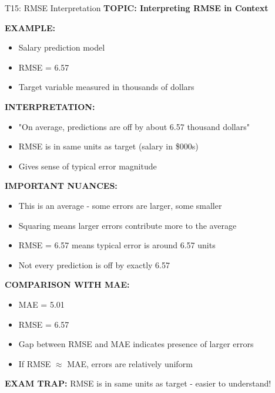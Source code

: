 \documentclass[8pt]{beamer}
\begin{document}
	\begin{frame}{T15: RMSE Interpretation}
		\fontsize{6.5}{7.5}\selectfont
		\textbf{TOPIC: Interpreting RMSE in Context}
		
		\vspace{0.1cm}
		\textbf{EXAMPLE:}
		\begin{itemize}
			\item Salary prediction model
			\item RMSE = 6.57
			\item Target variable measured in thousands of dollars
		\end{itemize}
		
		\vspace{0.1cm}
		\textbf{INTERPRETATION:}
		\begin{itemize}
			\item "On average, predictions are off by about 6.57 thousand dollars"
			\item RMSE is in same units as target (salary in \$000s)
			\item Gives sense of typical error magnitude
		\end{itemize}
		
		\vspace{0.1cm}
		\textbf{IMPORTANT NUANCES:}
		\begin{itemize}
			\item This is an average - some errors are larger, some smaller
			\item Squaring means larger errors contribute more to the average
			\item RMSE = 6.57 means typical error is around 6.57 units
			\item Not every prediction is off by exactly 6.57
		\end{itemize}
		
		\vspace{0.1cm}
		\textbf{COMPARISON WITH MAE:}
		\begin{itemize}
			\item MAE = 5.01
			\item RMSE = 6.57
			\item Gap between RMSE and MAE indicates presence of larger errors
			\item If RMSE $\approx$ MAE, errors are relatively uniform
		\end{itemize}
		
		\textcolor{myred}{\textbf{EXAM TRAP:}} RMSE is in \textcolor{myblue}{same units as target} - easier to understand!
	\end{frame}
	
\end{document}
